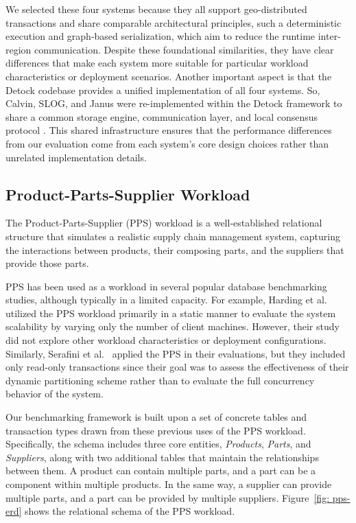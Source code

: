 We selected these four systems because they all support geo-distributed transactions and share comparable architectural principles, such a deterministic execution and graph-based serialization, which aim to reduce the runtime inter-region communication. Despite these foundational similarities, they have clear differences that make each system more suitable for particular workload characteristics or deployment scenarios. Another important aspect is that the Detock codebase provides a unified implementation of all four systems. So, Calvin, SLOG, and Janus were re-implemented within the Detock framework to share a common storage engine, communication layer, and local consensus protocol \cite{nguyen2023detock}. This shared infrastructure ensures that the performance differences from our evaluation come from each system's core design choices rather than unrelated implementation details.

\subsection{Product-Parts-Supplier Workload}
The Product-Parts-Supplier (PPS) workload is a well-established relational structure that simulates a realistic supply chain management system, capturing the interactions between products, their composing parts, and the suppliers that provide those parts.

PPS has been used as a workload in several popular database benchmarking studies, although typically in a limited capacity. For example, Harding et al.~\cite{harding2017evaluation} utilized the PPS workload primarily in a static manner to evaluate the system scalability by varying only the number of client machines. However, their study did not explore other workload characteristics or deployment configurations. Similarly, Serafini et al.~\cite{serafini2016clay} applied the PPS in their evaluations, but they included only read-only transactions since their goal was to assess the effectiveness of their dynamic partitioning scheme rather than to evaluate the full concurrency behavior of the system.

Our benchmarking framework is built upon a set of concrete tables and transaction types drawn from these previous uses of the PPS workload. Specifically, the schema includes three core entities, \textit{Products}, \textit{Parts}, and \textit{Suppliers}, along with two additional tables that maintain the relationships between them. A product can contain multiple parts, and a part can be a component within multiple products. In the same way, a supplier can provide multiple parts, and a part can be provided by multiple suppliers. Figure~\ref{fig: pps-erd} shows the relational schema of the PPS workload.

